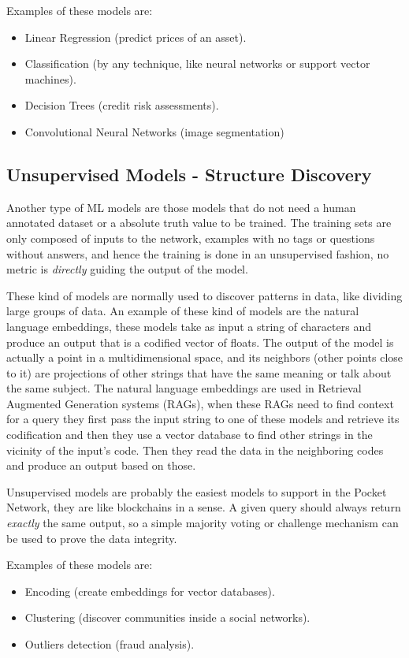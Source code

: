 Examples of these models are:
\begin{itemize}
    \item Linear Regression (predict prices of an asset).
    \item Classification (by any technique, like neural networks or support vector machines).
    \item Decision Trees (credit risk assessments).
    \item Convolutional Neural Networks (image segmentation)
\end{itemize}

\subsection{Unsupervised Models - Structure Discovery}

Another type of ML models are those models that do not need a human annotated dataset or a absolute truth value to be trained. The training sets are only composed of inputs to the network, examples with no tags or questions without answers, and hence the training is done in an unsupervised fashion, no metric is \emph{directly} guiding the output of the model.

These kind of models are normally used to discover patterns in data, like dividing large groups of data. An example of these kind of models are the natural language embeddings, these models take as input a string of characters and produce an output that is a codified vector of floats. The output of the model is actually a point in a multidimensional space, and its neighbors (other points close to it) are projections of other strings that have the same meaning or talk about the same subject. 
The natural language embeddings are used in Retrieval Augmented Generation systems (RAGs), when these RAGs need to find context for a query they first pass the input string to one of these models and retrieve its codification and then they use a vector database to find other strings in the vicinity of the input's code. Then they read the data in the neighboring codes and produce an output based on those.

Unsupervised models are probably the easiest models to support in the Pocket Network, they are like blockchains in a sense. A given query should always return \emph{exactly} the same output, so a simple majority voting or challenge mechanism can be used to prove the data integrity.


Examples of these models are:
\begin{itemize}
    \item Encoding (create embeddings for vector databases).
    \item Clustering (discover communities inside a social networks).
    \item Outliers detection (fraud analysis).
\end{itemize}

